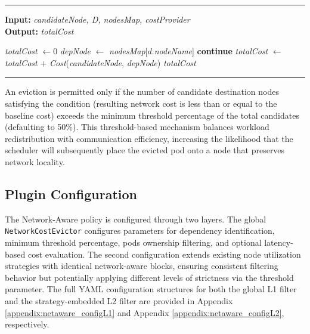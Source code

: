 \noindent\rule{\linewidth}{0.4pt}
\textbf{Input:} \textit{candidateNode, D, nodesMap, costProvider} \\
\textbf{Output:} \textit{totalCost}
\vspace{-0.5em}
\begin{algorithmic}[1]
\STATE \textit{totalCost} $\leftarrow 0$
    \STATE \textit{depNode} $\leftarrow$ \textit{nodesMap}[$d$.\textit{nodeName}]
        \STATE \textbf{continue}
    \ENDIF
    \STATE \textit{totalCost} $\leftarrow$ \textit{totalCost} $+$ 
    \STATE \hspace{1em} \textit{Cost}(\textit{candidateNode}, \textit{depNode})
\ENDFOR
\RETURN \textit{totalCost}
\end{algorithmic}
\vspace{-0.5em}
\noindent\rule{\linewidth}{0.4pt}
\vspace{0.5em}

An eviction is permitted only if the number of candidate destination nodes satisfying the condition (resulting network cost is less than or equal to the baseline cost) exceeds the minimum threshold percentage of the total candidates (defaulting to 50\%). This threshold-based mechanism balances workload redistribution with communication efficiency, increasing the likelihood that the scheduler will subsequently place the evicted pod onto a node that preserves network locality.

\subsection{Plugin Configuration}
The Network-Aware policy is configured through two layers. The global \texttt{NetworkCostEvictor} configures parameters for dependency identification, minimum threshold percentage, pods ownership filtering, and optional latency-based cost evaluation. The second configuration extends existing node utilization strategies with identical network-aware blocks, ensuring consistent filtering behavior but potentially applying different levels of strictness via the threshold parameter. The full YAML configuration structures for both the global L1 filter and the strategy-embedded L2 filter are provided in Appendix \ref{appendix:netaware_configL1} and Appendix \ref{appendix:netaware_configL2}, respectively.
